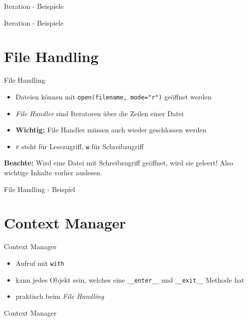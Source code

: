\begin{frame}{Iteration - Beispiele}
	
\end{frame}

\begin{frame}{Iteration - Beispiele}
	
\end{frame}


\section{File Handling}

\begin{frame}{File Handling}
	\begin{itemize}
		\item Dateien können mit \alert{\texttt{open(filename, mode="r")}} geöffnet werden
		\item \textit{File Handler} sind Iteratoren über die Zeilen einer Datei
		\item \textbf{Wichtig:} File Handler müssen auch wieder geschlossen werden
		\item \texttt{r} steht für Lesezugriff,  \texttt{w} für Schreibzugriff
	\end{itemize}
	\textbf{Beachte:} Wird eine Datei mit Schreibzugriff geöffnet, wird sie geleert! Also wichtige Inhalte vorher auslesen.
\end{frame}

\begin{frame}{File Handling - Beispiel}
	
\end{frame}


\section{Context Manager}

\begin{frame}{Context Manager}
	\begin{itemize}
		\item Aufruf mit \alert{\texttt{with}}
		\item kann jedes Objekt sein, welches eine \texttt{\_\_enter\_\_} und \texttt{\_\_exit\_\_} Methode hat
		\item praktisch beim \textit{File Handling}
	\end{itemize}
\end{frame}

\begin{frame}{Context Manager}
	
\end{frame}



